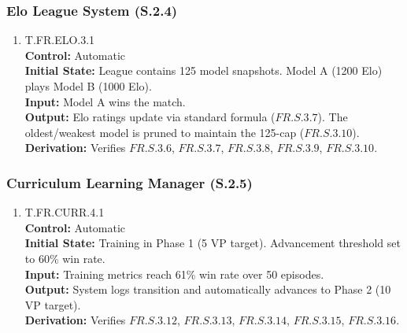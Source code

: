\documentclass[12pt, titlepage]{article}
\begin{document}
\subsubsection{Elo League System (S.2.4)}
\begin{enumerate}
    \item{\hypertarget{T.FR.ELO.3.1}{T.FR.ELO.3.1}\\}
    \textbf{Control:} Automatic \\
    \textbf{Initial State:} League contains 125 model snapshots. Model A (1200 Elo) plays Model B (1000 Elo). \\
    \textbf{Input:} Model A wins the match. \\
    \textbf{Output:} Elo ratings update via standard formula ($\hyperref[FR.S.3.7]{FR.S.3.7}$). The oldest/weakest model is pruned to maintain the 125-cap ($\hyperref[FR.S.3.10]{FR.S.3.10}$). \\
    \textbf{Derivation:} Verifies $\hyperref[FR.S.3.6]{FR.S.3.6}$, $\hyperref[FR.S.3.7]{FR.S.3.7}$, $\hyperref[FR.S.3.8]{FR.S.3.8}$, $\hyperref[FR.S.3.9]{FR.S.3.9}$, $\hyperref[FR.S.3.10]{FR.S.3.10}$.
\end{enumerate}

\subsubsection{Curriculum Learning Manager (S.2.5)}
\begin{enumerate}
    \item{\hypertarget{T.FR.CURR.4.1}{T.FR.CURR.4.1}\\}
    \textbf{Control:} Automatic \\
    \textbf{Initial State:} Training in Phase 1 (5 VP target). Advancement threshold set to 60\% win rate. \\
    \textbf{Input:} Training metrics reach 61\% win rate over 50 episodes. \\
    \textbf{Output:} System logs transition and automatically advances to Phase 2 (10 VP target). \\
    \textbf{Derivation:} Verifies $\hyperref[FR.S.3.12]{FR.S.3.12}$, $\hyperref[FR.S.3.13]{FR.S.3.13}$, $\hyperref[FR.S.3.14]{FR.S.3.14}$, $\hyperref[FR.S.3.15]{FR.S.3.15}$, $\hyperref[FR.S.3.16]{FR.S.3.16}$.
\end{enumerate}
\end{document}
